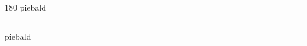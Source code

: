 
\begin{frame}
\begin{center}
\begin{turn}{180}
{\fontsize{2.5cm}{1em}\selectfont piebald}
\end{turn}
\vspace{1em}\par  
\hrule
\vspace{1em}\par  
{\fontsize{2.5cm}{1em}\selectfont piebald}
\end{center}
\end{frame}
